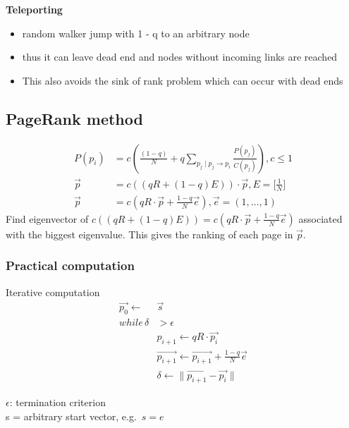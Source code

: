 \textbf{Teleporting}
\begin{itemize}
\item random walker jump with 1 - q to an arbitrary node
\item thus it can leave dead end and nodes without incoming links
  are reached
\item This also avoids the sink of rank problem which can occur with
  dead ends
\end{itemize}

\subsection{PageRank method}

\begin{align*}
  P(p_i) & = c( \frac{(1 - q)}{N} + q \sum_{p_j \mid p_j \rightarrow
           p_i} \frac{P(p_j)}{C(p_j)}), c \leq 1 \\
  \vec{p} & = c((q R + (1 - q) E)) \cdot \vec{p}, E = \bigg[
            \frac{1}{N} \bigg] \\
  \vec{p} & = c(qR \cdot \vec{p} + \frac{1 - q}{N} \vec{e}), \vec{e} =
            (1, \ldots, 1)
\end{align*}
Find eigenvector of $ c((q R + (1 - q) E)) = c(qR \cdot \vec{p} +
\frac{1 - q}{N} \vec{e}) $ associated with the biggest
eigenvalue. This gives the ranking of each page in $ \vec{p} $.

\subsubsection{Practical computation}

Iterative computation
\begin{align*}
  \vec{p_0} \leftarrow & \vec{s} \\
  while\,\delta & > \epsilon \\
                       & p_{i + 1} \leftarrow qR \cdot \vec{p_i} \\
                       & \vec{p_{i + 1}} \leftarrow \vec{p_{i + 1}} + \frac{1 - q}{N}
                         \vec{e} \\
                       & \delta \leftarrow \| \vec{p_{i + 1}} - \vec{p_i} \|
\end{align*}

$ \epsilon $: termination criterion \\
s = arbitrary start vector, e.g.\ $ s = e $

